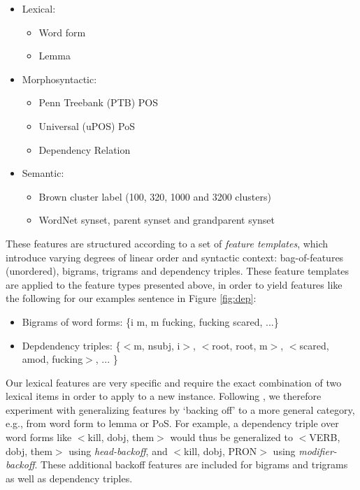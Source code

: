 \documentclass[11pt,letterpaper]{article}
\begin{document}
\begin{itemize}[noitemsep]
\item Lexical:
  \begin{itemize}[noitemsep]
  \item Word form
  \item Lemma
  \end{itemize}
  
\item Morphosyntactic:
  \begin{itemize}[noitemsep]
  \item Penn Treebank (PTB) POS
  \item Universal (uPOS) PoS
  \item Dependency Relation
  \end{itemize}
  
\item Semantic:
  \begin{itemize}[noitemsep]
    \item Brown cluster label (100, 320, 1000 and 3200 clusters)
    \item WordNet synset, parent synset and grandparent synset
  \end{itemize}
\end{itemize}

These features are structured according to a set of \emph{feature templates}, which introduce varying degrees of linear order and syntactic context: bag-of-features (unordered), bigrams, trigrams and dependency triples. These feature templates are applied to the feature types presented above, in order to yield features like the following for our examples sentence in Figure \ref{fig:dep}:

\begin{itemize}
\setlength\itemsep{0em}
\item Bigrams of word forms: \{i m,  m fucking, fucking scared, ...\}

\item Depdendency triples: \{$<$m, nsubj, i$>$, $<$root, root, m$>$, $<$scared, amod, fucking$>$, ... \}
\end{itemize}
Our lexical features are very specific and require the exact combination of two lexical items in order to apply to a new instance. Following , we therefore experiment with generalizing features by `backing off' to a more general category, e.g., from word form to lemma or PoS. For example, a dependency triple over word forms like $<$kill, dobj, them$>$ would thus be generalized to $<$VERB, dobj, them$>$ using \emph{head-backoff}, and $<$kill, dobj, PRON$>$ using \emph{modifier-backoff}. These additional backoff features are included for bigrams and trigrams as well as dependency triples.
\end{document}
